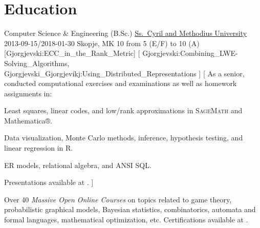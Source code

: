 \documentclass[10pt,letterpaper]{article}%
\begin{document}
\noindent%
\begin{minipage}[t]{.575\textwidth}
  \section{Education}%
  \label{sec:education}
  \EducationEntry%
  {Computer Science \& Engineering (B.Sc.)}%
  {\href{http://ukim.edu.mk/}{Ss.\ Cyril and Methodius University}}%
  {2013-09-15/2018-01-30}%
  {Skopje, MK}%
  {10}%
  {from 5 (E/F) to 10 (A)}%
  [Gjorgjevski:ECC_in_the_Rank_Metric]%
  [%
  Gjorgjevski:Combining_LWE-Solving_Algorithms,%
  Gjorgjevski_Gjorgjevikj:Using_Distributed_Representations%
  ]%
  [%
  As a senior, conducted computational exercises and examinations as well as
  homework assignments in:
  \begin{description}%
    [leftmargin=*,widest=Linear Algebra,font=\normalfont\itshape]
  \item[Linear Algebra] Least squares, linear codes, and low\-/rank
    approximations in \textsc{SageMath} and Mathematica®.
  \item[Statistics] Data visualization, Monte Carlo methods, inference,
    hypothesis testing, and linear regression in R.
  \item[Databases] ER models, relational algebra, and ANSI SQL\@.
  \end{description}
  Presentations available at .%
  ]

  \begin{tcolorbox}[size=fbox,fontlower=\small,colframe=black]
    Over \num{40} \emph{Massive Open Online Courses} on topics related to game
    theory, probabilistic graphical models, Bayesian statistics, combinatorics,
    automata and formal languages, mathematical optimization, etc.%
    \tcblower%
    Certifications available at
    .
  \end{tcolorbox}

  \printbibliography[type=thesis,title=Theses,heading=bibnumbered]
  \printbibliography[nottype=thesis,title=Publications,heading=bibnumbered]%
\end{minipage}%
\hfill%
\noindent%
\end{document}
